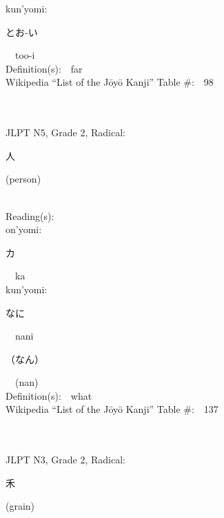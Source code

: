 \begin{multicols}{2}
{\hspace*{1em}}kun'yomi:\ \ \\
{\hspace*{2em}}{\begin{CJK}{UTF8}{min} とお-い \end{CJK}}\ \ too-i\ \ \\
Definition(s):\ \ far \\
Wikipedia ``List of the J\=oy\=o Kanji'' Table \#:\ \ 98 \\
\ \ \\
{\fontsize{34pt}{40pt}  }\ \ \\  %
{JLPT N5, Grade 2, Radical:\ \ {\begin{CJK}{UTF8}{min} 人 \end{CJK}} (person) } \\
Reading(s):\ \ \\
{\hspace*{1em}}on'yomi:\ \ \\
{\hspace*{2em}}{\begin{CJK}{UTF8}{min} カ \end{CJK}}\ \ ka\ \ \\
{\hspace*{1em}}kun'yomi:\ \ \\
{\hspace*{2em}}{\begin{CJK}{UTF8}{min} なに \end{CJK}}\ \ nani\ \ \\
{\hspace*{2em}}{\begin{CJK}{UTF8}{min} （なん） \end{CJK}}\ \ (nan)\ \ \\
Definition(s):\ \ what \\
Wikipedia ``List of the J\=oy\=o Kanji'' Table \#:\ \ 137 \\
\ \ \\
{\fontsize{34pt}{40pt}  }\ \ \\  %
{JLPT N3, Grade 2, Radical:\ \ {\begin{CJK}{UTF8}{min} 禾 \end{CJK}} (grain) } \\

\end{multicols}
